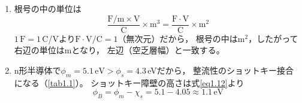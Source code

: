 \begin{enumerate}
\item[1.6節 問6]
根号の中の単位は
\begin{equation*}
\frac{\mathrm{F/m}\times\mathrm{V}}{\mathrm{C}}\times\mathrm{m^3}
= \frac{\mathrm{F\cdot V}}{\mathrm{C}}\times\mathrm{m^2}
\end{equation*}
$1\,\mathrm{F} = 1$\,C/Vより$\mathrm{F\cdot V/C} = 1$（無次元）だから，
根号の中は$\mathrm{m^2}$，したがって右辺の単位はmとなり，
左辺（空乏層幅）と一致する。

\item[1.7節 問7]
n形半導体で$\phi_m = 5.1\,\mathrm{eV} > \phi_s = 4.3$\,eVだから，
整流性のショットキー接合になる（\ref{tab1.1}）。
ショットキー障壁の高さは式\ref{eq1.12}より
\begin{equation*}
\phi_B = \phi_m - \chi_s = 5.1 - 4.05 \approx 1.1\,\mathrm{eV}
\end{equation*}

\end{enumerate}
